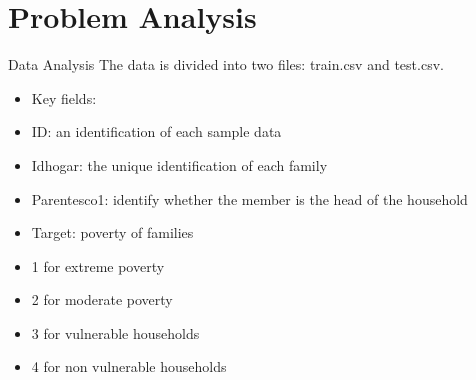 \documentclass[
 size=12pt,
 paper=smartboard, %
 mode=present, %
 display=slides, %
style=tuliplab,
pauseslide,
fleqn,leqno]{powerdot}
\begin{document}
    \section{Problem Analysis}
    \begin{slide}{Data Analysis}
        The data is divided into two files: train.csv and test.csv.\\
          \begin{itemize}
            \item Key fields:\\
            \item ID: an identification of each sample data\\
\item Idhogar: the unique identification of each family\\
\item Parentesco1: identify whether the member is the head of the household\\
\item Target: poverty of families\\
\item 1 for  extreme poverty\\
\item 2 for  moderate poverty\\
\item 3 for  vulnerable households\\
\item 4 for non vulnerable households\\
\end{itemize}

    \end{slide}
\end{document}
